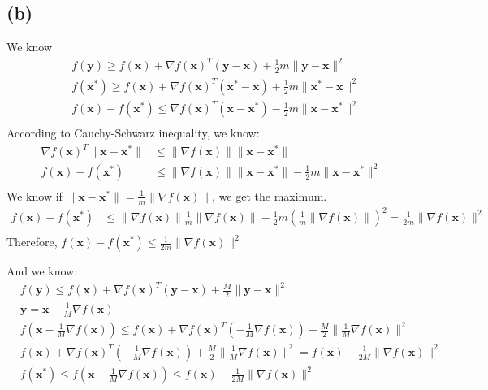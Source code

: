 \documentclass{article}
\begin{document}
\subsection*{(b)}
We know
\begin{align*}
    &f(\bm{y}) \geq f(\bm{x}) + \nabla f(\bm{x})^T (\bm{y} - \bm{x}) + \frac{1}{2} m \|\bm{y} - \bm{x}\|^2  \\
    &f(\bm{x}^*) \geq f(\bm{x}) + \nabla f(\bm{x})^T (\bm{x}^* - \bm{x}) + \frac{1}{2} m \|\bm{x}^* - \bm{x}\|^2  \\
    &f(\bm{x}) - f(\bm{x}^*) \leq  \nabla f(\bm{x})^T (\bm{x} - \bm{x}^*) - \frac{1}{2} m \|\bm{x} - \bm{x}^*\|^2  \\
\end{align*}
According to Cauchy-Schwarz inequality, we know:
\begin{align*}
    \nabla f(\bm{x})^T \|\bm{x} - \bm{x}^*\| &\leq \|\nabla f(\bm{x})\| \|\bm{x} - \bm{x}^*\|  \\
    f(\bm{x}) - f(\bm{x}^*) &\leq  \|\nabla f(\bm{x})\| \|\bm{x} - \bm{x}^*\| - \frac{1}{2} m \|\bm{x} - \bm{x}^*\|^2  \\
\end{align*}
We know if \(\|\bm{x} - \bm{x}^*\| = \frac{1}{m} \|\nabla f(\bm{x})\|\), we get the maximum.
\begin{align*}
    f(\bm{x}) - f(\bm{x}^*) &\leq  \|\nabla f(\bm{x})\| \frac{1}{m} \|\nabla f(\bm{x})\| - \frac{1}{2} m (\frac{1}{m} \|\nabla f(\bm{x})\|)^2 = \frac{1}{2m} \|\nabla f(\bm{x})\|^2 \\
\end{align*}
Therefore, \( f(\bm{x}) - f(\bm{x}^*) \leq \frac{1}{2m} \|\nabla f(\bm{x})\|^2 \)

And we know:
\begin{align*}
    &f(\bm{y}) \leq f(\bm{x}) + \nabla f(\bm{x})^T (\bm{y} - \bm{x}) + \frac{M}{2} \|\bm{y} - \bm{x}\|^2 \\
    & \bm{y} =  \bm{x} - \frac{1}{M} \nabla f(\bm{x}) \\
    & f(\bm{x} - \frac{1}{M} \nabla f(\bm{x})) \leq f(\bm{x}) + \nabla f(\bm{x})^T (- \frac{1}{M} \nabla f(\bm{x})) + \frac{M}{2} \|\frac{1}{M} \nabla f(\bm{x})\|^2 \\
    & f(\bm{x}) + \nabla f(\bm{x})^T (- \frac{1}{M} \nabla f(\bm{x})) + \frac{M}{2} \|\frac{1}{M} \nabla f(\bm{x})\|^2 = f(\bm{x}) - \frac{1}{2M}\|\nabla f(\bm{x})\|^2 \\
    & f(\bm{x}^*) \leq f(\bm{x} - \frac{1}{M} \nabla f(\bm{x})) \leq f(\bm{x}) - \frac{1}{2M}\|\nabla f(\bm{x})\|^2
\end{align*}
\end{document}
